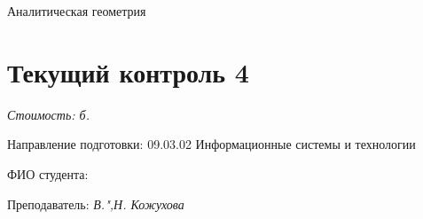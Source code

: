 \documentclass[a4paper, 12pt]{article}
\begin{document}
\thispagestyle{empty}

\vspace{-10ex}
	
\begin{center}
\Huge{Аналитическая геометрия}\\
\vspace{-3ex}
\section*{Текущий контроль 4}
\end{center}
\vspace{-2ex}	
\textit{Стоимость: \pointssum* б.}
\begin{flushleft}
Направление подготовки:  09.03.02 Информационные системы и технологии %

ФИО студента: %
 

Преподаватель: \textit{В.",Н. Кожухова}	
\end{flushleft}	
\end{document}
